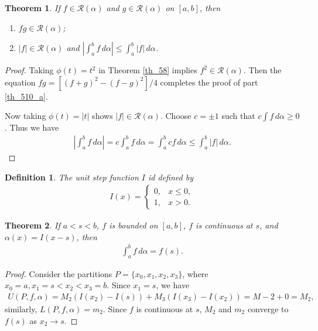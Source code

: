 \documentclass[11pt]{book}
\newtheorem{definition}{Definition}[chapter]
\newtheorem{theorem}{Theorem}[chapter]
\theoremstyle{definition}
\numberwithin{equation}{chapter}
\begin{document}
\medskip

\begin{theorem}\label{th_510}
If $f \in \mathscr{R}(\alpha)$ and $g \in \mathscr{R}(\alpha)$ on $[a,b]$, then
\begin{enumerate}[label=(\alph*)]
    \item $fg \in \mathscr{R}(\alpha)$; \label{th_510_a}
    
    \item $\left|f\right| \in \mathscr{R}(\alpha)$ and $\displaystyle \left|\int^b_a f \,d\alpha\right| \leq \int^b_a \left|f\right| \,d\alpha$. \label{th_510_b}
\end{enumerate}
\end{theorem}
\begin{proof}
Taking $\phi(t) = t^2$ in Theorem \ref{th_58} implies $f^2 \in \mathscr{R}(\alpha)$. Then the equation $fg = [(f + g)^2 - (f - g)^2]/4$ completes the proof of part \ref{th_510_a}.

Now taking $\phi(t) = \left|t\right|$ shows $\left|f\right| \in \mathscr{R}(\alpha)$. Choose $c = \pm 1$ such that $c \int f \,d\alpha \geq 0$. Thus we have
\begin{align*}
    \left|\int^b_a f \,d\alpha\right| = c \int^b_a f \,d\alpha = \int^b_a cf \,d\alpha \leq \int^b_a \left|f\right| \,d\alpha.
\end{align*}
\end{proof}

\medskip

\begin{definition}
The unit step function $I$ id defined by
\begin{align*}
    I(x) = \begin{cases}
        0, & x \leq 0, \\
        1, & x > 0.
    \end{cases}
\end{align*}
\end{definition}

\medskip

\begin{theorem}\label{th_511}
If $a < s < b$, $f$ is bounded on $[a,b]$, $f$ is continuous at $s$, and $\alpha(x) = I(x - s)$, then
\begin{align*}
    \int^b_a f \,d\alpha = f(s).
\end{align*}
\end{theorem}
\begin{proof}
Consider the partitions $P = \{x_0, x_1, x_2, x_3\}$, where $x_0 = a, x_1 = s < x_2 < x_3 = b$. Since $x_1 = s$, we have
\begin{align*}
    U(P,f,\alpha) = M_2 \left(I(x_2) - I(s)\right) + M_3 \left(I(x_3) - I(x_2)\right) = M-2 + 0 = M_2,
\end{align*}
similarly, $L(P,f,\alpha) = m_2$. Since $f$ is continuous at $s$, $M_2$ and $m_2$ converge to $f(s)$ as $x_2 \to s$.
\end{proof}
\end{document}
